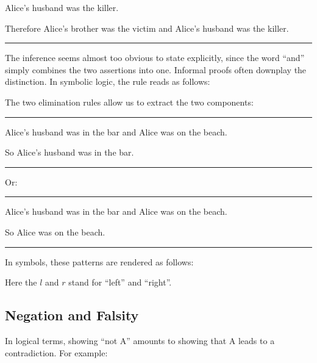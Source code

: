 \documentclass[letterpaper,10pt,english]{sphinxmanual}
\begin{document}
\sphinxAtStartPar
Alice’s husband was the killer.

\sphinxAtStartPar
Therefore Alice’s brother was the victim and Alice’s husband was the killer.


\bigskip\hrule\bigskip


\sphinxAtStartPar
The inference seems almost too obvious to state explicitly, since the word “and” simply combines the two assertions into one. Informal proofs often downplay the distinction. In symbolic logic, the rule reads as follows:



\begin{center}
\DP
\end{center}

\sphinxAtStartPar
The two elimination rules allow us to extract the two components:


\bigskip\hrule\bigskip


\sphinxAtStartPar
Alice’s husband was in the bar and Alice was on the beach.

\sphinxAtStartPar
So Alice’s husband was in the bar.


\bigskip\hrule\bigskip


\sphinxAtStartPar
Or:


\bigskip\hrule\bigskip


\sphinxAtStartPar
Alice’s husband was in the bar and Alice was on the beach.

\sphinxAtStartPar
So Alice was on the beach.


\bigskip\hrule\bigskip


\sphinxAtStartPar
In symbols, these patterns are rendered as follows:



\begin{center}
\DP
\quad
{}
\DP
\end{center}

\sphinxAtStartPar
Here the \(l\) and \(r\) stand for “left” and “right”.


\subsection{Negation and Falsity}
\label{\detokenize{propositional_logic:negation-and-falsity}}
\sphinxAtStartPar
In logical terms, showing “not A” amounts to showing that A leads to a contradiction. For example:
\end{document}
